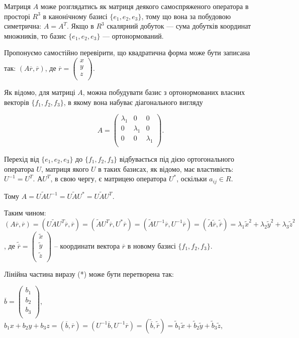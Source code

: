 Матриця $A$ може розглядатись як матриця деякого самоспряженого
оператора в просторі $R^3$ в канонічному базисі $\{e_1, e_2, e_3\}$, тому що вона за
побудовою симетрична: $A = A^T$. Якщо в $R^3$ скалярний добуток --- сума
добутків координат множників, то базис $\{e_1, e_2, e_3\}$ --- ортонормований.

Пропонуємо самостійно перевірити, що квадратична форма може бути
записана так: $(A \overline{r}, \overline{r})$, де $\overline{r} = \begin{pmatrix}
	x \\
	y \\
	z \\
\end{pmatrix}$.

Як відомо, для матриці $A$, можна побудувати базис з ортонормованих
власних векторів $\{f_1, f_2, f_3\}$, в якому вона набуває діагонального вигляду

$$A = \begin{pmatrix}
	\lambda_1 & 0 & 0 \\
	0 & \lambda_1 & 0 \\
	0 & 0 & \lambda_1 \\
\end{pmatrix}.$$

Перехід від $\{e_1, e_2, e_3\}$ до $\{f_1, f_2, f_3\}$ відбувається під дією ортогонального
оператора $U$, матриця якого $U$ в таких базисах, як відомо, має властивість:
$U^{-1} = U^T$. $А U^T$, в свою чергу, є матрицею оператора $U^*$, оскільки $a_{ij} \in R$.

Тому $A = U \tilde{A} U^{-1} = U \tilde{A} U^* = U \tilde{A} U^T$.

Таким чином: $(A \overline{r}, \overline{r}) = (U \tilde{A} U^T \overline{r}, \overline{r})
= (\tilde{A} U^T \overline{r}, U^* \overline{r}) = (\tilde{A} U^{-1} \overline{r}, U^{-1} \overline{r})
= (\tilde{A} \tilde{\overline{r}}, \tilde{\overline{r}}) = \lambda_1 \tilde{x}^2 + \lambda_2 \tilde{y}^2 + \lambda_3 \tilde{z}^2$,
де $\tilde{\overline{r}} = \begin{pmatrix}
	\tilde{x} \\
	\tilde{y} \\
	\tilde{z} \\
\end{pmatrix}$ -- координати вектора $\overline{r}$ в новому
базисі $\{f_1, f_2, f_3\}$.

Лінійна частина виразу (*) може бути перетворена так:

$\overline{b} = \begin{pmatrix}
	b_1 \\
	b_2 \\
	b_3 \\
\end{pmatrix}$, $b_1 x + b_2 y + b_3 z = (\overline{b}, \overline{r})
= (U^{-1} \overline{b}, U^{-1} \overline{r}) = (\tilde{\overline{b}},\tilde{\overline{r}})
= \tilde{b}_1 \tilde{x} + \tilde{b}_2 \tilde{y} + \tilde{b}_3 \tilde{z}$,

